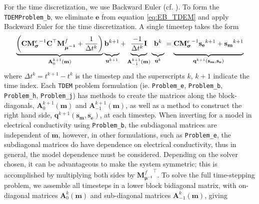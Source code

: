 \documentclass[preprint,review,3p,times,onecolumn,authoryear]{elsarticle}
\newcommand{\TDEM}{\texttt{TDEM}\xspace}
\newcommand{\M}{{\mathbf M}}
\newcommand{\MfMui}{{\M^f_{\boldsymbol{\mu^{-1}}}}}
\newcommand{\MeSigma}{{\M^e_{\boldsymbol{\sigma}}}}
\begin{document}
For the time discretization, we use Backward Euler (cf. \cite{Ascher2008}). To
form the \TDEM \texttt{Problem\_b}, we eliminate $\mathbf{e}$ from equation
\ref{eq:EB_TDEM} and apply Backward Euler for the time discretization. A
single timestep takes the form
\begin{equation}
    \underbrace{\left( \mathbf{C} \MeSigma^{-1} \mathbf{C}^\top \MfMui + \frac{1}{\Delta t^{k}} \right)}_{\mathbf{A}^{k+1}_0(\mathbf{m})}
    \underbrace{\vphantom{\left(\frac{-1}{\Delta t^{k}}\right)}
    \mathbf{b}^{k+1}}_{\mathbf{u}^{k+1}}
    + \underbrace{\vphantom{\left(\frac{-1}{\Delta t^{k}}\right)} \frac{-1}{\Delta t^{k}} \mathbf{I}}_{\mathbf{A}_{-1}^{k+1}(\mathbf{m})}
    \underbrace{\vphantom{\left(\frac{-1}{\Delta t^{k}}\right)}
    \mathbf{b}^{k}}_{\mathbf{u}^{k}}
    = \underbrace{\vphantom{\left(\frac{-1}{\Delta t^{k}}\right)}
    \mathbf{C}\MeSigma^{-1} \mathbf{s_e}^{k+1}
    + \mathbf{s_m}^{k+1}}_{\mathbf{q}^{k+1}(\mathbf{s_m, s_e})}
    \label{eq:TDEM_b_single}
\end{equation}
where $\Delta t^k = t^{k+1} - t^{k}$ is the timestep and the superscripts $k$,
$k+1$ indicate the time index. Each \TDEM problem formulation (ie.
\texttt{Problem\_e}, \texttt{Problem\_b}, \texttt{Problem\_h},
\texttt{Problem\_j}) has methods to create the matrices along the block-diagonals,
$\mathbf{A}_0^{k+1}(\mathbf{m})$ and $\mathbf{A}_{-1}^{k+1}(\mathbf{m})$,
as well as a method to construct the right hand side, $\mathbf{q}^{k+1}(\mathbf{s_m, s_e})$,
at each timestep. When inverting for a model in electrical
conductivity using \texttt{Problem\_b}, the subdiagonal matrices are
independent of $\mathbf{m}$, however, in other formulations, such as \texttt{Problem\_e},
the subdiagonal matrices do have dependence on electrical conductivity, thus in general, the model
dependence must be considered. Depending on the solver chosen, it can be
advantageous to make the system symmetric; this is accomplished by multiplying
both sides by $\MfMui^\top$. To solve the full time-stepping problem, we
assemble all timesteps in a lower block bidiagonal matrix, with on-diagonal
matrices $\mathbf{A}_0^k(\mathbf{m})$ and sub-diagonal matrices
$\mathbf{A}_{-1}^k(\mathbf{m})$, giving
\end{document}
